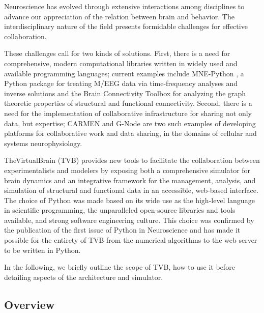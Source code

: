\documentclass{bioinfo}
\begin{document}
Neuroscience has evolved through extensive interactions among disciplines
to advance our appreciation of the relation between brain and behavior.
The interdisciplinary nature of the field presents formidable challenges
for effective collaboration.

These challenges call for two kinds of solutions. First, there is a need for
comprehensive, modern computational libraries written in widely used and
available programming languages; current examples include MNE-Python
\citep{mnepython}, a Python package for treating M/EEG data via time-frequency
analyses and inverse solutions and the Brain Connectivity Toolbox
\citep{rubinov2010complex} for analyzing the graph theoretic properties of
structural and functional connectivity. Second, there is a need for the
implementation of collaborative infrastructure for sharing not only data, but
expertise; CARMEN \citep{austin2011carmen} and G-Node \citep{herz2008g} are two
such examples of developing platforms for collaborative work and data sharing,
in the domains of cellular and systems neurophysiology.

TheVirtualBrain (TVB) provides new tools to facilitate the collaboration
between experimentalists and modelers by exposing both a comprehensive
simulator for brain dynamics and an integrative framework for the management,
analysis, and simulation of structural and functional data in an accessible,
web-based interface. The choice of Python was made based on its wide use as the
high-level language in scientific programming, the unparalleled open-source
libraries and tools available, and strong software engineering culture.  This
choice was confirmed by the publication of the first issue of Python in
Neuroscience and has made it possible for the entirety of TVB from the
numerical algorithms to the web server to be written in Python.

In the following, we briefly outline the scope of TVB, how to use it before detailing
aspects of the architecture and simulator.

\subsection{Overview}
\end{document}
